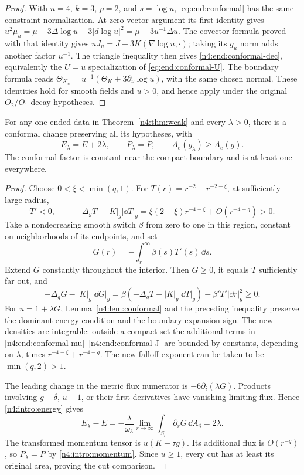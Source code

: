 \begin{proof}
With $n=4$, $k=3$, $p=2$, and $s=\log u$,
\eqref{eq:end:conformal} has the same constraint normalization.
At zero vector argument its first identity gives
$u^2\mu_u=\mu-3\Delta\log u-3|d\log u|^2
=\mu-3u^{-1}\Delta u$.
The covector formula proved with that identity gives
$uJ_u=J+3K(\nabla\log u,\cdot)$; taking its $g_u$ norm adds
another factor $u^{-1}$. The triangle inequality then gives
\eqref{n4:end:conformal-dec}, equivalently the $U=u$
specialization of \eqref{eq:end:conformal-U}.
The boundary formula reads
$\Theta_{K_u}=u^{-1}(\Theta_K+3\partial_\nu\log u)$,
with the same chosen normal. These identities hold for smooth fields
and $u>0$, and hence apply under the original $O_2/O_1$ decay hypotheses.
\end{proof}

\begin{lemma}\label{n4:end:positive-shell}
For any one-ended data in Theorem~\ref{n4:thm:weak} and every \(\lambda>0\),
there is a conformal change preserving all its hypotheses, with
\[
 E_\lambda=E+2\lambda,\qquad P_\lambda=P,
 \qquad A_e(g_\lambda)\ge A_e(g).
\]
The conformal factor is constant near the compact boundary and is at
least one everywhere.
\end{lemma}

\begin{proof}
Choose \(0<\xi<\min(q,1)\). For
\(T(r)=r^{-2}-r^{-2-\xi}\), at sufficiently large radius,
\[
 T'<0,\qquad
 -\Delta_gT-|K|_g|\dd T|_g
 =\xi(2+\xi)r^{-4-\xi}+O(r^{-4-q})>0.
\]
Take a nondecreasing smooth switch \(\beta\) from zero to one in this
region, constant on neighborhoods of its endpoints, and set
\[
 G(r)=-\int_r^\infty\beta(s)T'(s)\,\dd s.
\]
Extend \(G\) constantly throughout the interior. Then \(G\ge0\), it
equals \(T\) sufficiently far out, and
\[
 -\Delta_gG-|K|_g|\dd G|_g
 =\beta(-\Delta_gT-|K|_g|\dd T|_g)
       -\beta'T'|\dd r|_g^2\ge0.
\]
For \(u=1+\lambda G\), Lemma~\ref{n4:lem:conformal} and the preceding
inequality preserve the dominant energy condition and the boundary
expansion sign.
The new densities are integrable: outside a compact set the additional
terms in \eqref{n4:end:conformal-mu}--\eqref{n4:end:conformal-J} are bounded
by constants, depending on \(\lambda\), times
\(r^{-4-\xi}+r^{-4-q}\). The new falloff exponent can be taken to be
\(\min(q,2)>1\).

The leading change in the metric flux numerator is
\(-6\partial_i(\lambda G)\). Products involving
\(g-\delta\), \(u-1\), or their first derivatives have vanishing
limiting flux. Hence \eqref{n4:intro:energy} gives
\[
 E_\lambda-E=-\frac{\lambda}{\omega_3}
       \lim_{r\to\infty}\int_{S_r}\partial_rG\,\dd A_\delta
       =2\lambda.
\]
The transformed momentum tensor is \(u(K-\tau g)\). Its
additional flux is \(O(r^{-q})\), so \(P_\lambda=P\) by
\eqref{n4:intro:momentum}. Since \(u\ge1\), every cut has at least its
original area, proving the cut comparison.
\end{proof}

